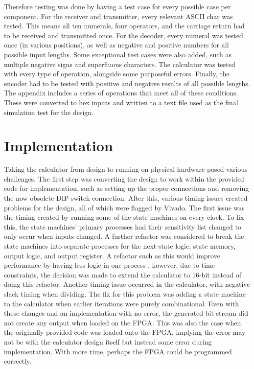 \documentclass[11pt]{article}
\begin{document}
Therefore testing was done by having a test case for every possible case per component.
For the receiver and transmitter, every relevant ASCII char was tested.
This means all ten numerals, four operators, and the carriage return had to be received and transmitted once.
For the decoder, every numeral was tested once (in various positions), as well as negative and positive numbers for all possible input lengths.
Some exceptional test cases were also added, such as multiple negative signs and superfluous characters.
The calculator was tested with every type of operation, alongside some purposeful errors.
Finally, the encoder had to be tested with positive and negative results of all possible lengths.
The appendix includes a series of operations that meet all of these conditions.
These were converted to hex inputs and written to a text file used as the final simulation test for the design. 


\section{Implementation}

Taking the calculator from design to running on physical hardware posed various challenges.
The first step was converting the design to work within the provided code for implementation, such as setting up the proper connections and removing the now obsolete DIP switch connection.
After this, various timing issues created problems for the design, all of which were flagged by Vivado. 
The first issue was the timing created by running some of the state machines on every clock. 
To fix this, the state machines' primary processes had their sensitivity list changed to only occur when inputs changed.
A further refactor was considered to break the state machines into separate processes for the next-state logic, state memory, output logic, and output register.
A refactor such as this would improve performance by having less logic in one process \cite{wakerly1990digital},
however, due to time constraints, the decision was made to extend the calculator to 16-bit instead of doing this refactor.
Another timing issue occurred in the calculator, with negative slack timing when dividing. 
The fix for this problem was adding a state machine to the calculator when earlier iterations were purely combinational. 
Even with these changes and an implementation with no error, the generated bit-stream did not create any output when loaded on the FPGA.
This was also the case when the originally provided code was loaded onto the FPGA, implying the error may not be with the calculator design itself but instead some error during implementation.
With more time, perhaps the FPGA could be programmed correctly.
\end{document}
